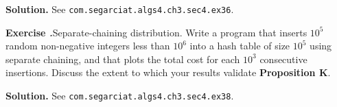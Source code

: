 \documentclass[12pt, a4paper]{article}
\newenvironment{ex}[2][Exercise]
{\par\medskip\noindent \textbf{#1 #2.}}
{\medskip}
\newenvironment{sol}[1][Solution]
{\par\medskip\noindent \textbf{#1.} }
{\medskip}
\begin{document}
	\begin{sol}
		See \texttt{com.segarciat.algs4.ch3.sec4.ex36}.
	\end{sol}
	\begin{ex}{38}
		\emph{Separate-chaining distribution}. Write a program that inserts $10^5$ random non-negative
		integers less than $10^6$ into a hash table of size $10^5$ using separate chaining, and
		that plots the total cost for each $10^3$ consecutive insertions. Discuss the extent to
		which your results validate \textbf{Proposition K}.
	\end{ex}
	\begin{sol}
		See \texttt{com.segarciat.algs4.ch3.sec4.ex38}.
	\end{sol}
	\pagebreak
	\printbibliography
\end{document}
